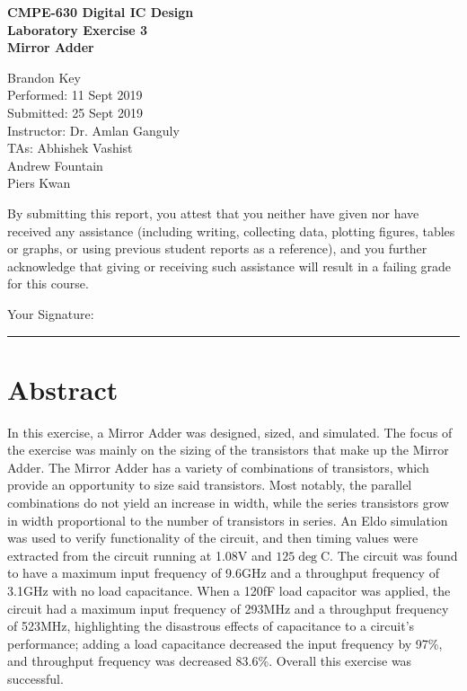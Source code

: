 \documentclass[11pt]{article}
\begin{document}
%
%

\vspace*{2 cm}

\begin{center}
\bf{CMPE-630 Digital IC Design\\
    Laboratory Exercise 3\\
\vspace{0.25 cm}
Mirror Adder
}
\end{center}

\vspace{6 cm}

\begin{flushright}
Brandon Key\\
Performed: 11 Sept 2019\\
Submitted: 25 Sept 2019\\
\vspace{0.5 cm}
Instructor: Dr. Amlan Ganguly\\
TAs: Abhishek Vashist\\
Andrew Fountain\\
Piers Kwan\\
\vspace{0.5 cm}
\end{flushright}

\vspace{3 cm}
\indent By submitting this report, you attest that you neither have given nor have received any assistance (including writing, collecting data, plotting figures, tables or graphs, or using previous student reports as a reference), and you further acknowledge that giving or receiving such assistance will result in a failing grade for this course.

\vspace{1 cm}
Your Signature:   \rule{13cm}{.1pt}


\tableofcontents
\newpage

\section{Abstract}
	In this exercise, a Mirror Adder was designed, sized, and simulated. The focus of the exercise was mainly on the sizing of the transistors that make up the Mirror Adder. The Mirror Adder has a variety of combinations of transistors, which provide an opportunity to size said transistors. Most notably, the parallel combinations do not yield an increase in width, while the series transistors grow in width proportional to the number of transistors in series. An Eldo simulation was used to verify functionality of the circuit, and then timing values were extracted from the circuit running at 1.08V and $125\deg$C. The circuit was found to have a maximum input frequency of 9.6GHz and a throughput frequency of 3.1GHz with no load capacitance. When a 120fF load capacitor was applied, the circuit had a maximum input frequency of 293MHz and a throughput frequency of 523MHz, highlighting the disastrous effects of capacitance to a circuit's performance; adding a load capacitance decreased the input frequency by 97\%, and throughput frequency was decreased 83.6\%. Overall this exercise was successful.
\end{document}
